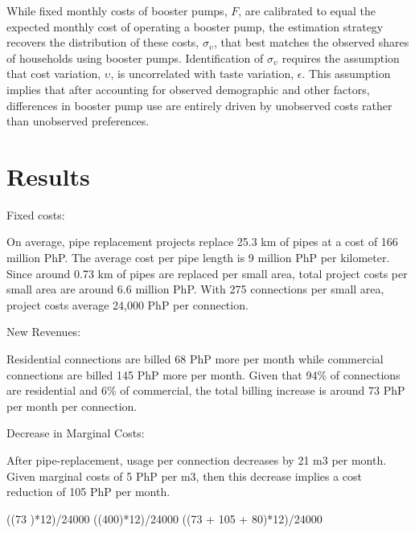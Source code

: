 \documentclass[12pt,table]{article}
\begin{document}
While fixed monthly costs of booster pumps, $F$, are calibrated to equal the expected monthly cost of operating a booster pump, the estimation strategy recovers the distribution of these costs, $\sigma_{\upsilon}$, that best matches the observed shares of households using booster pumps.  Identification of $\sigma_{\upsilon}$ requires the assumption that cost variation, $\upsilon$, is uncorrelated with taste variation, $\epsilon$.  This assumption implies that after accounting for observed demographic and other factors, differences in booster pump use are entirely driven by unobserved costs rather than unobserved preferences.



\section{Results}





Fixed costs:

On average, pipe replacement projects replace 25.3 km of pipes at a cost of 166 million PhP.  The average cost per pipe length is 9 million PhP per kilometer.  Since around 0.73 km of pipes are replaced per small area, total project costs per small area are around 6.6 million PhP.  With 275 connections per small area, project costs average 24,000 PhP per connection.   

New Revenues:

Residential connections are billed 68 PhP more per month while commercial connections are billed 145 PhP more per month.  Given that 94\% of connections are residential and 6\% of commercial, the total billing increase is around 73 PhP per month per connection.  

Decrease in Marginal Costs:

After pipe-replacement, usage per connection decreases by 21 m3 per month.  Given marginal costs of 5 PhP per m3, then this decrease implies a cost reduction of 105 PhP per month.  


((73 )*12)/24000
((400)*12)/24000
((73 + 105 + 80)*12)/24000
\end{document}
